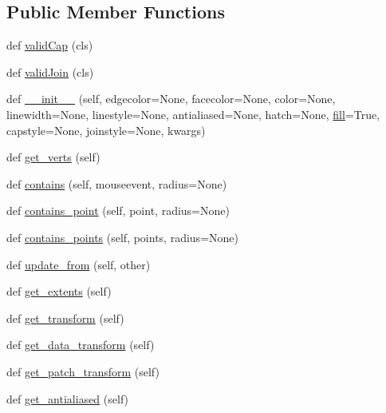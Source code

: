 \subsection*{Public Member Functions}
\begin{DoxyCompactItemize}
\item 
def \hyperlink{classmatplotlib_1_1patches_1_1Patch_ae449773a7bcadaba08e89e476c9fbc71}{valid\+Cap} (cls)
\item 
def \hyperlink{classmatplotlib_1_1patches_1_1Patch_a84818f09812a3e941ecbf051c849d3a6}{valid\+Join} (cls)
\item 
def \hyperlink{classmatplotlib_1_1patches_1_1Patch_a38e59a65cd560eae8171f2c8e9a73fc3}{\+\_\+\+\_\+init\+\_\+\+\_\+} (self, edgecolor=None, facecolor=None, color=None, linewidth=None, linestyle=None, antialiased=None, hatch=None, \hyperlink{classmatplotlib_1_1patches_1_1Patch_a59e3f9086d41642557cf2f8fb1d57a6d}{fill}=True, capstyle=None, joinstyle=None, kwargs)
\item 
def \hyperlink{classmatplotlib_1_1patches_1_1Patch_a285b62a8f1c9fbc9d8b5579355edb34f}{get\+\_\+verts} (self)
\item 
def \hyperlink{classmatplotlib_1_1patches_1_1Patch_a5c8af9644e5f7de78e3ac5815f269dbd}{contains} (self, mouseevent, radius=None)
\item 
def \hyperlink{classmatplotlib_1_1patches_1_1Patch_a71fcaf2b147c2bdcea177c89251d533a}{contains\+\_\+point} (self, point, radius=None)
\item 
def \hyperlink{classmatplotlib_1_1patches_1_1Patch_ac15e677836abd69dd498b4ac202f923b}{contains\+\_\+points} (self, points, radius=None)
\item 
def \hyperlink{classmatplotlib_1_1patches_1_1Patch_aea6ccc767ab5adfc87fc60674906cf25}{update\+\_\+from} (self, other)
\item 
def \hyperlink{classmatplotlib_1_1patches_1_1Patch_ac4496e71fecd194a6632ac7ffaf7bf23}{get\+\_\+extents} (self)
\item 
def \hyperlink{classmatplotlib_1_1patches_1_1Patch_af080d5a2f69c8b9dca63821c6cbae121}{get\+\_\+transform} (self)
\item 
def \hyperlink{classmatplotlib_1_1patches_1_1Patch_a7aa7eb6e62cb39a77f5661337fb7da0c}{get\+\_\+data\+\_\+transform} (self)
\item 
def \hyperlink{classmatplotlib_1_1patches_1_1Patch_a2d7aa6feda4757cbf2eb366384f925db}{get\+\_\+patch\+\_\+transform} (self)
\item 
def \hyperlink{classmatplotlib_1_1patches_1_1Patch_aebc8e82b39444d077c96866cbbd2a23a}{get\+\_\+antialiased} (self)

\end{DoxyCompactItemize}
